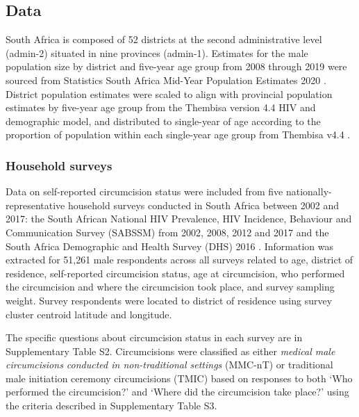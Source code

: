 \documentclass{article}
\begin{document}

\subsection*{Data}


South Africa is composed of 52 districts at the second administrative level (admin-2) situated in nine provinces (admin-1). Estimates for the male population size by district and five-year age group from 2008 through 2019 were sourced from Statistics South Africa Mid-Year Population Estimates 2020 \cite{StatsSAPop}. District population estimates were scaled to align with provincial population estimates by five-year age group from the Thembisa version 4.4 HIV and demographic model, and distributed to single-year of age according to the proportion of population within each single-year age group from Thembisa v4.4 \cite{johnson2021thembisa}.


\subsubsection*{Household surveys}


Data on self-reported circumcision status were included from five nationally-representative household surveys conducted in South Africa between 2002 and 2017: the South African National HIV Prevalence, HIV Incidence, Behaviour and Communication Survey (SABSSM) from 2002, 2008, 2012 and 2017 \cite{hsrc2017, hsrc2012, hsrc2008, hsrc2002} and the South Africa Demographic and Health Survey (DHS) 2016 \cite{dhs2016}. Information was extracted for 51,261 male respondents across all surveys related to age, district of residence, self-reported circumcision status, age at circumcision, who performed the circumcision and where the circumcision took place, and survey sampling weight. Survey respondents were located to district of residence using survey cluster centroid latitude and longitude.

The specific questions about circumcision status in each survey are in Supplementary Table S2. Circumcisions were classified as either \textit{medical male circumcisions conducted in non-traditional settings} (MMC-nT) or traditional male initiation ceremony circumcisions (TMIC) based on responses to both `Who performed the circumcision?' and `Where did the circumcision take place?' using the criteria described in Supplementary Table S3.
\end{document}
